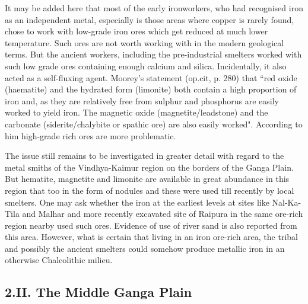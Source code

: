 It may be added here that most of the early ironworkers, who had recognised iron as an independent metal, especially is those areas where copper is rarely found, chose to work with low-grade iron ores which get reduced at much lower temperature. Such ores are not worth working with in the modern geological terms. But the ancient workers, including the pre-industrial smelters worked with such low grade ores containing enough calcium and silica. Incidentally, it also acted as a self-fluxing agent. Moorey's statement (op.cit, p. 280) that ``red oxide (haematite) and the hydrated form (limonite) both contain a high proportion of iron and, as they are relatively free from sulphur and phosphorus are easily worked to yield iron. The magnetic oxide (magnetite/leadstone) and the carbonate (siderite/chalybite or spathic ore) are also easily worked". According to him high-grade rich ores are more problematic.

The issue still remains to be investigated in greater detail with regard to the metal smiths of the Vindhya-Kaimur region on the borders of the Ganga Plain. But hematite, magnetite and limonite are available in great abundance in this region that too in the form of nodules and these were used till recently by local smelters. One may ask whether the iron at the earliest levels at sites like Nal-Ka-Tila and Malhar and more recently excavated site of Raipura in the same ore-rich region nearby used such ores. Evidence of use of river sand is also reported from this area. However, what is certain that living in an iron ore-rich area, the tribal and possibly the ancient smelters could somehow produce metallic iron in an otherwise Chalcolithic milieu.

\subsection*{2.II. The Middle Ganga Plain}\label{subsection-5}

\vspace{-.2cm}


